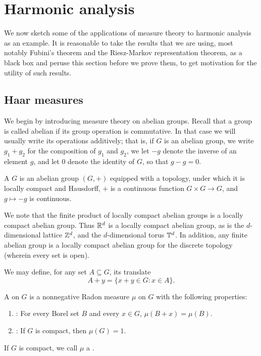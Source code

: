 \chapter{Harmonic analysis}

We now sketch some of the applications of measure theory to harmonic analysis as an example.
It is reasonable to take the results that we are using, most notably Fubini's theorem and the Riesz-Markov representation theorem, as a black box and peruse this section before we prove them, to get motivation for the utility of such results.

\section{Haar measures}
We begin by introducing measure theory on abelian groups. Recall that a group is called abelian if its group operation is commutative.
In that case we will usually write its operations additively; that is, if $G$ is an abelian group, we write $g_{1} + g_{2}$ for the composition of $g_{1}$ and $g_{2}$, we let $-g$ denote the inverse of an element $g$, and let $0$ denote the identity of $G$, so that $g - g = 0$.

\begin{definition}
A  $G$ is an abelian group $(G, +)$ equipped with a topology, under which it is locally compact and Hausdorff, $+$ is a continuous function $G \times G \to G$, and $g \mapsto -g$ is continuous.
\end{definition}

We note that the finite product of locally compact abelian groups is a locally compact abelian group.
Thus $\mathbb{R}^{d}$ is a locally compact abelian group, as is the $d$-dimensional lattice $\mathbb{Z}^{d}$, and the $d$-dimensional torus $\mathbb{T}^{d}$.
In addition, any finite abelian group is a locally compact abelian group for the discrete topology (wherein every set is open).

We may define, for any set $A \subseteq G$, its translate
\[A + y = \{x + y \in G: x \in A\}.\]

\begin{definition}
A  on $G$ is a nonnegative Radon measure $\mu$ on $G$ with the following properties:
\begin{enumerate}
\item {}: For every Borel set $B$ and every $x \in G$, $\mu(B+x) = \mu(B)$.
\item {}: If $G$ is compact, then $\mu(G) = 1$.
\end{enumerate}
If $G$ is compact, we call $\mu$ a .
\end{definition}

